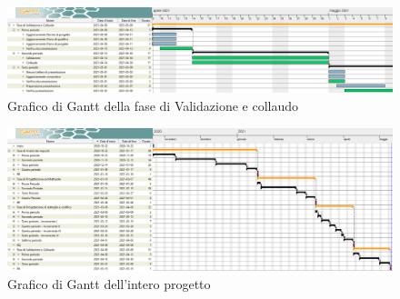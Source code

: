 \begin{landscape}
	\begin{figure}[H]
		\centering
		\includegraphics[width=\linewidth]{res/images/ganttFase4.png}
		\caption{Grafico di Gantt della fase di Validazione e collaudo}
		\label{fig:Gantt Analisi dei requisiti}
	\end{figure}
\end{landscape}


\begin{landscape}
	\begin{figure}[H]
		\centering
		\includegraphics[width=\linewidth]{res/images/ganttTotale.png}
		\caption{Grafico di Gantt dell'intero progetto}
		\label{fig:Gantt Analisi dei requisiti}
	\end{figure}
\end{landscape}

